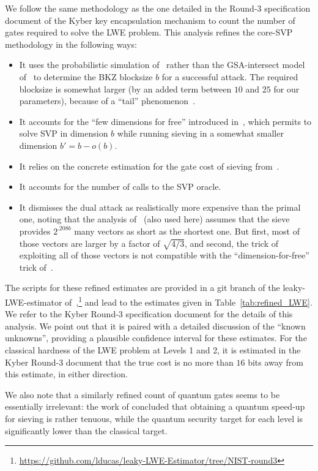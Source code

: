 \documentclass{iacrcc}
\begin{document}
We follow the same methodology as the one detailed in the Round-3 specification document of the Kyber key encapsulation mechanism \cite{EuroSP:Kyber} to count the number of gates required to solve the LWE problem. This analysis refines the core-SVP methodology in the following ways:
\begin{itemize}
	\item It uses the probabilistic simulation of~\cite{dachman2020lwe} rather than the GSA-intersect model of~\cite{USENIX:ADPS16,AC:AGVW17} to determine the BKZ blocksize $b$ for a successful attack. The required blocksize is somewhat larger (by an added term between $10$ and $25$ for our parameters), because of a ``tail'' phenomenon~\cite{yu2017second}.
	\item It accounts for the ``few dimensions for free'' introduced in~\cite{ducas2018shortest}, which permits to solve SVP in dimension $b$ while running sieving in a somewhat smaller dimension $b' = b-o(b)$.
	\item It relies on the concrete estimation for the gate cost of sieving from~\cite{albrecht2019estimating}.
	\item It accounts for the number of calls to the SVP oracle.
	\item It dismisses the dual attack as realistically more expensive than the primal one, noting that the analysis of~\cite{USENIX:ADPS16} (also used here) assumes that the sieve provides $2^{.208b}$ many vectors as short as the shortest one. But first, most of those vectors are larger by a factor of $\sqrt{4/3}$, and second, the trick of exploiting all of those vectors is not compatible with the ``dimension-for-free'' trick of~\cite{ducas2018shortest}.
\end{itemize}
The scripts for these refined estimates are provided in a git branch of the leaky-LWE-estimator of~\cite{dachman2020lwe},\footnote{\url{https://github.com/lducas/leaky-LWE-Estimator/tree/NIST-round3}} and lead to the estimates given in Table~\ref{tab:refined_LWE}. We refer to the Kyber Round-3 specification document for the details of this analysis. We point out that it is paired with a detailed discussion of the ``known unknowns'', providing a plausible confidence interval for these estimates. For the classical hardness of the LWE problem at Levels 1 and 2, it is estimated in the Kyber Round-3 document that the true cost is no more than $16$ bits away from this estimate, in either direction. 

We also note that a similarly refined count of quantum gates seems to be essentially irrelevant: the work of \cite{albrecht2019estimating} concluded that obtaining a quantum speed-up for sieving is rather tenuous, while the quantum security target for each level is significantly lower than the classical target. 
\end{document}
